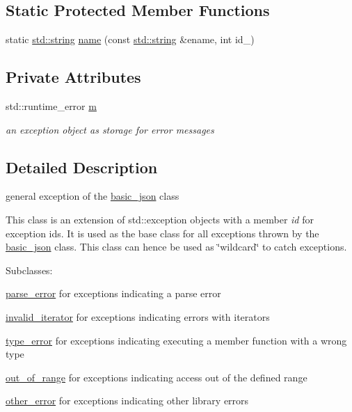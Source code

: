\subsection*{Static Protected Member Functions}
\begin{DoxyCompactItemize}
\item 
static \hyperlink{namespacenlohmann_1_1detail_a1ed8fc6239da25abcaf681d30ace4985ab45cffe084dd3d20d928bee85e7b0f21}{std\+::string} \hyperlink{classnlohmann_1_1detail_1_1exception_abf41a7e9178356314082284e6cfea278}{name} (const \hyperlink{namespacenlohmann_1_1detail_a1ed8fc6239da25abcaf681d30ace4985ab45cffe084dd3d20d928bee85e7b0f21}{std\+::string} \&ename, int id\+\_\+)
\end{DoxyCompactItemize}
\subsection*{Private Attributes}
\begin{DoxyCompactItemize}
\item 
std\+::runtime\+\_\+error \hyperlink{classnlohmann_1_1detail_1_1exception_ad54778dc4f125488cbce8ec276dfdde2}{m}
\begin{DoxyCompactList}\small\item\em an exception object as storage for error messages \end{DoxyCompactList}\end{DoxyCompactItemize}


\subsection{Detailed Description}
general exception of the \hyperlink{classnlohmann_1_1basic__json}{basic\+\_\+json} class 

This class is an extension of {\ttfamily std\+::exception} objects with a member {\itshape id} for exception ids. It is used as the base class for all exceptions thrown by the \hyperlink{classnlohmann_1_1basic__json}{basic\+\_\+json} class. This class can hence be used as \char`\"{}wildcard\char`\"{} to catch exceptions.

Subclasses\+:
\begin{DoxyItemize}
\item \hyperlink{classnlohmann_1_1detail_1_1parse__error}{parse\+\_\+error} for exceptions indicating a parse error
\item \hyperlink{classnlohmann_1_1detail_1_1invalid__iterator}{invalid\+\_\+iterator} for exceptions indicating errors with iterators
\item \hyperlink{classnlohmann_1_1detail_1_1type__error}{type\+\_\+error} for exceptions indicating executing a member function with a wrong type
\item \hyperlink{classnlohmann_1_1detail_1_1out__of__range}{out\+\_\+of\+\_\+range} for exceptions indicating access out of the defined range
\item \hyperlink{classnlohmann_1_1detail_1_1other__error}{other\+\_\+error} for exceptions indicating other library errors
\end{DoxyItemize}

